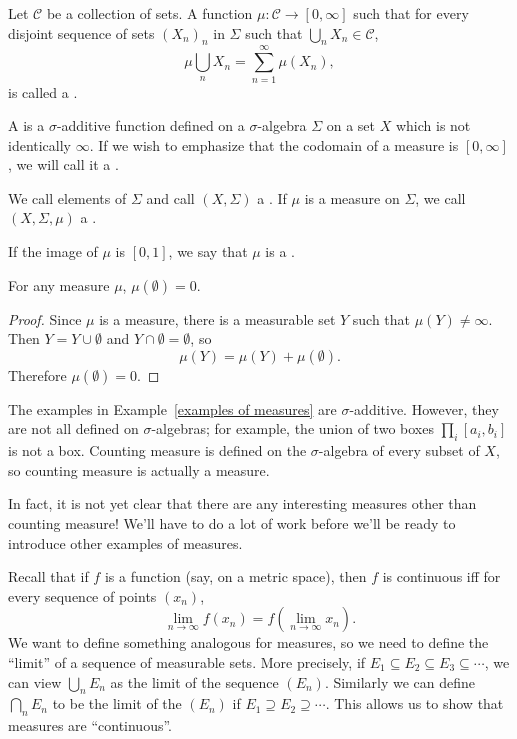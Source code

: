 \begin{definition}
Let $\mathcal C$ be a collection of sets.
A function $\mu: \mathcal C \to [0, \infty]$ such that for every disjoint sequence of sets ${(X_{n})}_{n}$ in $\Sigma$ such that $\bigcup_{n} X_{n} \in \mathcal C$,
\[\mu\bigcup_{n} X_{n} = \sum_{n=1}^{\infty} \mu(X_{n}),\]
is called a .
\end{definition}

\begin{definition}
A  is a $\sigma$-additive function defined on a $\sigma$-algebra $\Sigma$ on a set $X$ which is not identically $\infty$.
If we wish to emphasize that the codomain of a measure is $[0, \infty]$, we will call it a .

We call elements of $\Sigma$  and call $(X, \Sigma)$ a .
If $\mu$ is a measure on $\Sigma$, we call $(X, \Sigma, \mu)$ a .

If the image of $\mu$ is $[0, 1]$, we say that $\mu$ is a .
\end{definition}

\begin{lemma}\label{empty set is null}
For any measure $\mu$, $\mu(\emptyset) = 0$.
\end{lemma}
\begin{proof}
Since $\mu$ is a measure, there is a measurable set $Y$ such that $\mu(Y) \neq \infty$.
Then $Y = Y \cup \emptyset$ and $Y \cap \emptyset = \emptyset$, so
\[\mu(Y) = \mu(Y) + \mu(\emptyset).\]
Therefore $\mu(\emptyset) = 0$.
\end{proof}

\begin{example}
The examples in Example~\ref{examples of measures} are $\sigma$-additive.
However, they are not all defined on $\sigma$-algebras; for example, the union of two boxes $\prod_{i} [a_{i}, b_{i}]$ is not a box.
Counting measure is defined on the $\sigma$-algebra of every subset of $X$, so counting measure is actually a measure.

In fact, it is not yet clear that there are any interesting measures other than counting measure!
We'll have to do a lot of work before we'll be ready to introduce other examples of measures.
\end{example}

\begin{subsec}
Recall that if $f$ is a function (say, on a metric space), then $f$ is continuous iff for every sequence of points $(x_{n})$,
\[\lim_{n \to \infty} f(x_{n}) = f\left(\lim_{n \to \infty} x_{n}\right).\]
We want to define something analogous for measures, so we need to define the ``limit'' of a sequence of measurable sets.
More precisely, if $E_{1} \subseteq E_{2} \subseteq E_{3} \subseteq \cdots$, we can view $\bigcup_{n} E_{n}$ as the limit of the sequence $(E_{n})$.
Similarly we can define $\bigcap_{n} E_{n}$ to be the limit of the $(E_{n})$ if $E_{1} \supseteq E_{2} \supseteq \cdots$.
This allows us to show that measures are ``continuous''.
\end{subsec}

